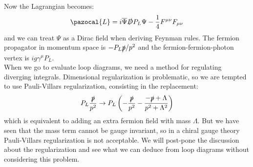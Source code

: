 \documentclass[../main.tex]{subfiles}
\begin{document}
Now the Lagrangian becomes:
\[
\pazocal{L}=i\overline{\Psi}\slashed{D}P_L\Psi-\frac{1}{4}F^{\mu\nu}F_{\mu\nu}
\]
and we can treat $\Psi$ as a Dirac field when deriving Feynman rules. The fermion propagator in momentum space is $-P_L\slashed{p}/p^2$ and the fermion-fermion-photon vertex is $ig\gamma^\mu P_L$.\\
When we go to evaluate loop diagrams, we need a method for regulating diverging integrals. Dimensional regularization is problematic, so we are tempted to use Pauli-Villars regularization, consisting in the replacement:
\[
P_L\frac{\slashed{p}}{p^2}\to P_L\left(-\frac{\slashed{p}}{p^2}-\frac{-\slashed{p}+\Lambda}{p^2+\Lambda^2}\right)
\]
which is equivalent to adding an extra fermion field with mass $\Lambda$. But we have seen that the mass term cannot be gauge invariant, so in a chiral gauge theory Pauli-Villars regularization is not acceptable. We will post-pone the discussion about the regularization and see what we can deduce from loop diagrams without considering this problem. 
\end{document}
